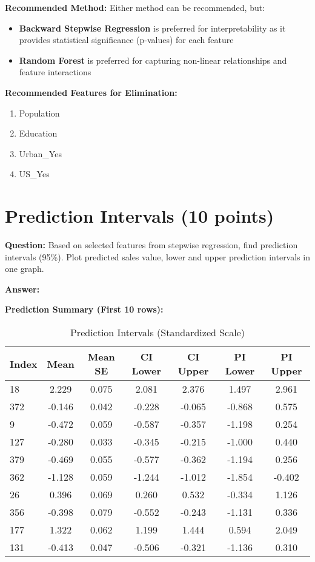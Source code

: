 \documentclass[11pt]{article}
\begin{document}
\textbf{Recommended Method:} Either method can be recommended, but:
\begin{itemize}
    \item \textbf{Backward Stepwise Regression} is preferred for interpretability as it provides statistical significance (p-values) for each feature
    \item \textbf{Random Forest} is preferred for capturing non-linear relationships and feature interactions
\end{itemize}

\textbf{Recommended Features for Elimination:}
\begin{enumerate}
    \item Population
    \item Education
    \item Urban\_Yes
    \item US\_Yes
\end{enumerate}

\section{Prediction Intervals (10 points)}

\textbf{Question:} Based on selected features from stepwise regression, find prediction intervals (95\%). Plot predicted sales value, lower and upper prediction intervals in one graph.

\textbf{Answer:}

\textbf{Prediction Summary (First 10 rows):}
\begin{table}[H]
\centering
\caption{Prediction Intervals (Standardized Scale)}
\scriptsize
\begin{tabular}{lcccccc}
\toprule
\textbf{Index} & \textbf{Mean} & \textbf{Mean SE} & \textbf{CI Lower} & \textbf{CI Upper} & \textbf{PI Lower} & \textbf{PI Upper} \\
\midrule
18 & 2.229 & 0.075 & 2.081 & 2.376 & 1.497 & 2.961 \\
372 & -0.146 & 0.042 & -0.228 & -0.065 & -0.868 & 0.575 \\
9 & -0.472 & 0.059 & -0.587 & -0.357 & -1.198 & 0.254 \\
127 & -0.280 & 0.033 & -0.345 & -0.215 & -1.000 & 0.440 \\
379 & -0.469 & 0.055 & -0.577 & -0.362 & -1.194 & 0.256 \\
362 & -1.128 & 0.059 & -1.244 & -1.012 & -1.854 & -0.402 \\
26 & 0.396 & 0.069 & 0.260 & 0.532 & -0.334 & 1.126 \\
356 & -0.398 & 0.079 & -0.552 & -0.243 & -1.131 & 0.336 \\
177 & 1.322 & 0.062 & 1.199 & 1.444 & 0.594 & 2.049 \\
131 & -0.413 & 0.047 & -0.506 & -0.321 & -1.136 & 0.310 \\
\bottomrule
\end{tabular}
\end{table}
\end{document}
